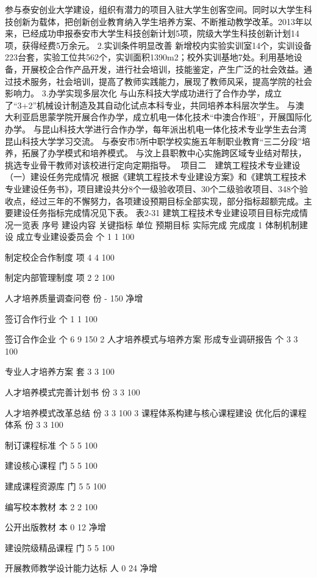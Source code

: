 参与泰安创业大学建设，组织有潜力的项目入驻大学生创客空间。同时以大学生科技创新为载体，把创新创业教育纳入学生培养方案、不断推动教学改革。2013年以来，已经成功申报泰安市大学生科技创新计划5项，院级大学生科技创新计划14项，获得经费5万余元。
2.实训条件明显改善   
新增校内实验实训室14个，实训设备223台套，实验工位共562个，实训面积1390m2；校外实训基地7处。利用基地设备，开展校企合作产品开发，进行社会培训，技能鉴定，产生广泛的社会效益。通过技术服务，社会培训，提高了教师实践能力，展现了教师风采，提高学院的社会影响力。
3.办学实现多层次化
与山东科技大学成功进行了合作办学，成立了“3+2”机械设计制造及其自动化试点本科专业，共同培养本科层次学生。
与澳大利亚启思蒙学院开展合作办学，成立机电一体化技术“中澳合作班”，开展国际化办学。
与昆山科技大学进行合作办学，每年派出机电一体化技术专业学生去台湾昆山科技大学学习交流。
与泰安市5所中职学校实施五年制职业教育“三二分段”培养，拓展了办学模式和培养模式。
与汶上县职教中心实施跨区域专业结对帮扶，挑选专业骨干教师对该校进行定向定期指导。
项目二　建筑工程技术专业建设
（一）建设任务完成情况
根据《建筑工程技术专业建设方案》和《建筑工程技术专业建设任务书》，项目建设共分8个一级验收项目、30个二级验收项目、348个验收点，经过三年的不懈努力，各项建设预期目标全部实现，部分指标超额完成。主要建设任务指标完成情况见下表。
表2-31  建筑工程技术专业建设项目目标完成情况一览表
序号
建设内容
关键指标
单位
预期目标
实际完成
完成度
1
体制机制建设
成立专业建设委员会
个
1
1
100%


制定校企合作制度
项
4
4
100%


制定内部管理制度
项
2
2
100%


人才培养质量调查问卷
份
-
150
净增


签订合作行业
个
1
1
100%


签订合作企业
个
6
9
150%
2
人才培养模式与培养方案
形成专业调研报告
个
3
3
100%


专业人才培养方案
套
3
3
100%


人才培养模式完善计划书
份
3
3
100%


人才培养模式改革总结
份
3
3
100%
3
课程体系构建与核心课程建设
优化后的课程体系
份
3
3
100%


制订课程标准
个
5
5
100%


建设核心课程
门
5
5
100%


建成课程资源库
门
5
5
100%


编写校本教材
本
2
2
100%


公开出版教材
本
0
12
净增


建设院级精品课程
门
5
5
100%


开展教师教学设计能力达标
人
0
24
净增


